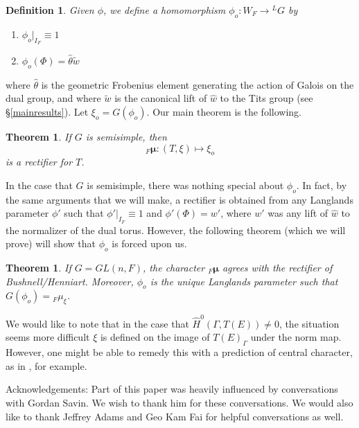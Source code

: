 \documentclass[11pt]{amsart}
\theoremstyle{plain}
\newtheorem{theorem}[enumi]{Theorem}
\newtheorem{definition}[enumi]{Definition}
\begin{document}
\begin{definition}
Given $\phi$, we define a homomorphism $\phi_o : W_F \rightarrow {}^L G$ by
\begin{enumerate}
\item $\phi_o|_{I_F} \equiv 1$
\item $\phi_o(\Phi) = \hat{\theta} \tilde{w}$
\end{enumerate}
\end{definition}

where $\hat{\theta}$ is the geometric  Frobenius element generating the action of Galois on the dual group, and where $\tilde{w}$ is the canonical lift  of $\hat{w}$ to the Tits group (see \S\ref{mainresults}). Let $\xi_o = G(\phi_o)$.  Our main theorem is the following.

\begin{theorem}
If $G$ is semisimple, then $${}_F \boldsymbol\mu : (T, \xi) \mapsto \xi_o$$ is a rectifier for $T$.
\end{theorem}

In the case that $G$ is semisimple, there was nothing special about $\phi_o$.  In fact, by the same arguments that we will make, a rectifier is obtained from any Langlands parameter $\phi'$ such that $\phi'|_{I_F} \equiv 1$ and $\phi'(\Phi) = w'$, where $w'$ was any lift of $\hat{w}$ to the normalizer of the dual torus.  However, the following theorem (which we will prove) will show that $\phi_o$ is forced upon us. 

\begin{theorem}
If $G = GL(n,F)$, the character ${}_F \boldsymbol\mu$ agrees with the rectifier of Bushnell/Henniart.  Moreover, $\phi_o$ is the unique  Langlands parameter such that $G(\phi_o) = {}_F \mu_{\xi}$.
\end{theorem}

We would like to note that in the case that $\hat{H}^0(\Gamma, T(E)) \neq 0$, the situation seems more difficult $\xi$ is defined on the image of $T(E)_{\Gamma}$ under the norm map.  However, one might be able to remedy this with a prediction of central character, as in \cite{grossreeder}, for example.

Acknowledgements: Part of this paper was heavily influenced by conversations with Gordan Savin.  We wish to thank him for these conversations.  We would also like to thank Jeffrey Adams and Geo Kam Fai for helpful conversations as well.
\end{document}
